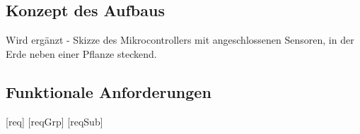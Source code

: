 \documentclass[pointlessnumbers]{scrartcl}
\begin{document}
\subsection{Konzept des Aufbaus}
    Wird ergänzt - Skizze des Mikrocontrollers mit angeschlossenen Sensoren, in der Erde neben einer Pflanze steckend.



\subsection{Funktionale Anforderungen}

\newcommand{\BreiteErsterTab}{3cm}
\newcommand{\BreiteZweiterTab}{10cm}






[req] 
[reqGrp] 
[reqSub] 

\renewcommand\thereq{/F\arabic{req}000/} 
\renewcommand\thereqGrp{/F\arabic{req}\arabic{reqGrp}00/} 
\renewcommand\thereqSub{/F\arabic{req}\arabic{reqGrp}\arabic{reqSub}0/} 
\renewcommand\thereqProc{/F\arabic{req}\arabic{reqGrp}\arabic{reqSub}\arabic{reqProc}/} 




\newcommand{\requirement}[2]{%
  \refstepcounter{req}
  \label{#1} 
  \thereq~#2
} 

\newcommand{\requirementGroup}[2]{%
  \refstepcounter{reqGrp}
  \label{#1} 
  \thereqGrp~#2
} 

\newcommand{\requirementSubGroup}[2]{%
  \refstepcounter{reqSub}
  \label{#1} 
  \thereqSub~#2
} 

\newcommand{\requirementProcess}[2]{%
  \refstepcounter{reqProc}
  \label{#1} 
  \thereqProc~#2
} 




    
\end{document}
